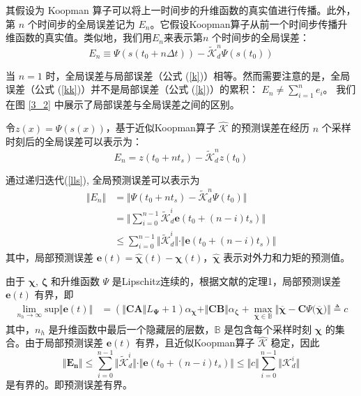 \documentclass[lang=chs, degree=master, blindreview=false, winfonts=true]{yanputhesis}
\begin{document}
其假设为 Koopman 算子可以将上一时间步的升维函数的真实值进行传播。此外，第 \( n \) 个时间步的全局误差记为 $E_n$。它假设Koopman算子从前一个时间步传播升维函数的真实值。类似地，我们用$E_n$来表示第\( n \) 个时间步的全局误差：	
\begin{equation}
	E_n\equiv\Psi(s(t_0+n\Delta t))-\tilde{\mathcal{K}}_d^n\Psi(s(t_0))
	\label{kk}
\end{equation}


当 \( n = 1 \) 时，全局误差与局部误差（公式 (\ref{k})）相等。然而需要注意的是，全局误差（公式 (\ref{kk})）并不是局部误差（公式 (\ref{k})）的累积： 
$
E_n \neq \sum_{i=1}^n e_i
$。
我们在图 \ref{3_2} 中展示了局部误差与全局误差之间的区别。

	令$z(x)=\Psi(s(x))$，基于近似Koopman算子 $\hat{{\mathcal{K}}}$ 的预测误差在经历 $n$ 个采样时刻后的全局误差可以表示为：
	\begin{equation}
		{E}_n = {z}(t_0 + nt_s) - \tilde{\mathcal{K}}_d^n {z}(t_0)
	\end{equation}


	
	通过递归迭代(\ref{lls}), 全局预测误差可以表示为
	\begin{equation}
    	\begin{aligned}
		\Vert {E_n} \Vert &= \Vert {\Psi}(t_0+nt_s) -\tilde{\mathcal{K}}_d^n {\Psi}(t_0) \Vert  \\
		&=\Vert \sum_{i=0}^{n-1}\tilde{\mathcal{K}}_d^i\bm{e}(t_0+(n-i)t_s)\Vert \\
		&\le \sum_{i=0}^{n-1}\Vert \tilde{\mathcal{K}}_d^i\Vert \cdot \Vert \bm{e}(t_0+(n-i)t_s) \Vert
	\end{aligned}
	\end{equation}
	其中，局部预测误差 $\bm{e}(t)=\bm{\hat{\chi}}(t)-\bm{\chi}(t)$，$\bm{\hat{\chi}}$ 表示对外力和力矩的预测值。
	
	由于 $\bm{\chi}$, $\bm{\zeta}$ 和升维函数 ${\Psi}$ 是Lipschitz连续的，根据文献\cite{Hao2024}的定理1，局部预测误差 $\bm{e}(t)$ 有界，即
	\begin{equation}
    	\begin{aligned}
		\lim_{n_h\rightarrow \infty} \text{sup} \Vert \bm{e}(t) \Vert &=(\Vert \bm{CA} \Vert L_{\bm{\Psi}}+1) \alpha_{\bm{\chi}}+\Vert \bm{CB}\Vert \alpha_{\bm{\zeta}} +\max_{\overline{\bm{\chi}}\in \mathbb{B}} \Vert \overline{\bm{\chi}} -\bm{C} \Psi\bm{(\overline{\bm{\chi}}}) \Vert \triangleq c
	\end{aligned}
	\end{equation}
	其中，$n_h$ 是升维函数中最后一个隐藏层的层数，$\mathbb{B}$ 是包含每个采样时刻 $\bm{\chi}$ 的集合。由于局部预测误差 $\bm{e}(t)$ 有界，且近似Koopman算子 $\hat{\bm{\mathcal{K}}}$ 稳定，因此
	\begin{equation}
    	\Vert \bm{E_n} \Vert \le \sum_{i=0}^{n-1}\Vert \tilde{\mathcal{K}}_d^i\Vert \cdot \Vert \bm{e}(t_0+(n-i)t_s) \Vert\le \Vert c \Vert \sum_{i=0}^{n-1}\Vert {\mathcal{K}}_d^i \Vert
	\end{equation}
	是有界的。即预测误差有界。
\end{document}
